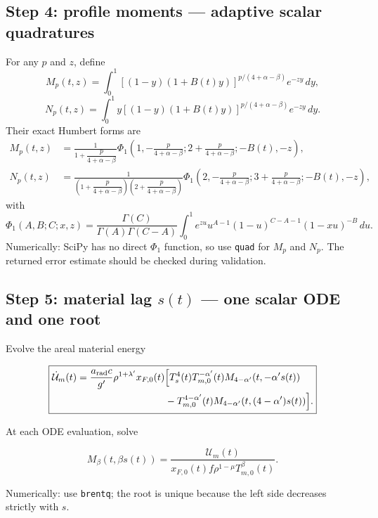 \documentclass[11pt]{article}
\numberwithin{equation}{section}
\newcommand{\Ts}{T_s}
\newcommand{\Tm}{T_{m,0}}
\newcommand{\xfzero}{x_{F,0}}
\newcommand{\arad}{a_{\rm rad}}
\newcommand{\dif}{\,d}
\newcommand{\calU}{\mathcal{U}}
\begin{document}
\subsection*{Step 4: profile moments --- adaptive scalar quadratures}

For any $p$ and $z$, define
\begin{equation}
 \boxed{
 M_p(t,z)=\int_0^1
 [(1-y)(1+B(t)y)]^{p/(4+\alpha-\beta)}e^{-zy}\dif y,}
 \label{eq:sum_M}
\end{equation}
\begin{equation}
 \boxed{
 N_p(t,z)=\int_0^1
 y[(1-y)(1+B(t)y)]^{p/(4+\alpha-\beta)}e^{-zy}\dif y.}
 \label{eq:sum_N}
\end{equation}
Their exact Humbert forms are
\begin{align}
 M_p(t,z)
 &=\frac{1}{1+\dfrac{p}{4+\alpha-\beta}}
 \Phi_1\!\left(
 1,-\frac{p}{4+\alpha-\beta};
 2+\frac{p}{4+\alpha-\beta};-B(t),-z\right),
 \label{eq:sum_M_humbert}\\
 N_p(t,z)
 &=\frac{1}
 {\left(1+\dfrac{p}{4+\alpha-\beta}\right)
  \left(2+\dfrac{p}{4+\alpha-\beta}\right)}
 \Phi_1\!\left(
 2,-\frac{p}{4+\alpha-\beta};
 3+\frac{p}{4+\alpha-\beta};-B(t),-z\right),
 \label{eq:sum_N_humbert}
\end{align}
with
\begin{equation}
 \boxed{
 \Phi_1(A,B;C;x,z)
 =\frac{\Gamma(C)}{\Gamma(A)\Gamma(C-A)}
 \int_0^1e^{zu}u^{A-1}(1-u)^{C-A-1}
 (1-xu)^{-B}\dif u.}
 \label{eq:sum_humbert_integral}
\end{equation}
Numerically: SciPy has no direct $\Phi_1$ function, so use
\texttt{quad} for $M_p$ and $N_p$.  The returned error estimate
should be checked during validation.

\subsection*{Step 5: material lag $s(t)$ --- one scalar ODE and one root}

Evolve the areal material energy
\begin{resultbox}
\begin{equation}
 \boxed{
 \begin{aligned}
 \dot{\calU}_m(t)
 ={}&\frac{\arad c}{g'}\rho^{1+\lambda'}\xfzero(t)
 \Big[
 \Ts^4(t)\Tm^{-\alpha'}(t)
 M_{4-\alpha'}(t,-\alpha's(t))
 \\
 &\hspace{27mm}
 -\Tm^{4-\alpha'}(t)
 M_{4-\alpha'}(t,(4-\alpha')s(t))
 \Big].
 \end{aligned}}
 \label{eq:sum_U_ode}
\end{equation}
\end{resultbox}
At each ODE evaluation, solve
\begin{resultbox}
\begin{equation}
 \boxed{
 M_\beta(t,\beta s(t))
 =\frac{\calU_m(t)}
 {\xfzero(t)f\rho^{1-\mu}\Tm^\beta(t)}.}
 \label{eq:sum_s_root}
\end{equation}
\end{resultbox}
Numerically: use \texttt{brentq}; the root is unique because the
left side decreases strictly with $s$.
\end{document}
